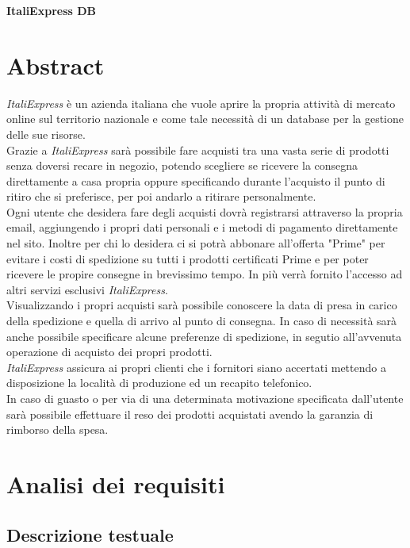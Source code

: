 \documentclass[11pt]{article}
\begin{document}
\begin{center}
    \huge\textbf{ItaliExpress DB}
\end{center}

\section{Abstract}

\textit{ItaliExpress} è un azienda italiana che vuole aprire la propria attività di mercato online
sul territorio nazionale e come tale necessità di un database per la gestione delle sue risorse.\\
Grazie a \textit{ItaliExpress} sarà possibile fare acquisti tra una vasta serie di prodotti 
senza doversi recare in negozio, potendo scegliere se ricevere la consegna direttamente a casa
propria oppure specificando durante l'acquisto il punto di ritiro che si preferisce,
per poi andarlo a ritirare personalmente.\\
Ogni utente che desidera fare degli acquisti dovrà registrarsi attraverso la propria email,
aggiungendo i propri dati personali e i metodi di pagamento direttamente nel sito.
Inoltre per chi lo desidera ci si potrà abbonare all'offerta "Prime" per evitare i costi di spedizione
su tutti i prodotti certificati Prime e per poter ricevere le propire consegne in brevissimo tempo.
In più verrà fornito l'accesso ad altri servizi esclusivi \textit{ItaliExpress}.\\
Visualizzando i propri acquisti sarà possibile conoscere la data di presa in carico della spedizione
e quella di arrivo al punto di consegna. In caso di necessità sarà anche possibile specificare alcune preferenze
di spedizione, in segutio all'avvenuta operazione di acquisto dei propri prodotti.\\
\textit{ItaliExpress} assicura ai propri clienti che i fornitori siano accertati mettendo a disposizione
la località di produzione ed un recapito telefonico.\\
In caso di guasto o per via di una determinata motivazione specificata dall'utente sarà
possibile effettuare il reso dei prodotti acquistati avendo la garanzia di rimborso della spesa. 

\section{Analisi dei requisiti}

\subsection{Descrizione testuale}
\end{document}
